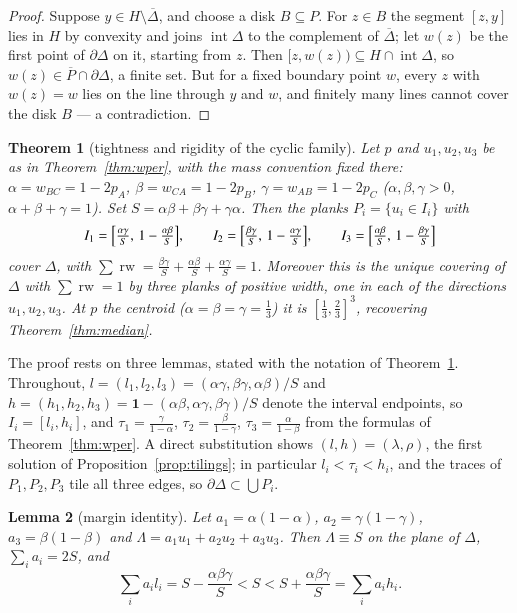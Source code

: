 \documentclass{aims}
\numberwithin{equation}{section}
\theoremstyle{plain}
\newtheorem{theorem}{Theorem}[section]
\newtheorem{lemma}[theorem]{Lemma}
\theoremstyle{definition}
\theoremstyle{remark}
\newcommand{\rw}{\operatorname{rw}}
\begin{document}
\begin{proof}
Suppose $y\in H\setminus\overline\Delta$, and choose a disk $B\subseteq P$. For
$z\in B$ the segment $[z,y]$ lies in $H$ by convexity and joins
$\operatorname{int}\Delta$ to the complement of $\overline\Delta$; let $w(z)$ be
the first point of $\partial\Delta$ on it, starting from $z$. Then
$[z,w(z))\subseteq H\cap\operatorname{int}\Delta$, so
$w(z)\in\overline P\cap\partial\Delta$, a finite set. But for a fixed boundary
point $w$, every $z$ with $w(z)=w$ lies on the line through $y$ and $w$, and
finitely many lines cannot cover the disk $B$ --- a contradiction.
\end{proof}

\begin{theorem}[tightness and rigidity of the cyclic family]\label{thm:tight}
Let $p$ and $u_1,u_2,u_3$ be as in Theorem~\ref{thm:wper}, with the mass
convention fixed there: $\alpha=w_{BC}=1-2p_A$, $\beta=w_{CA}=1-2p_B$,
$\gamma=w_{AB}=1-2p_C$ ($\alpha,\beta,\gamma>0$, $\alpha+\beta+\gamma=1$). Set
$S=\alpha\beta+\beta\gamma+\gamma\alpha$. Then the planks $P_i=\{u_i\in I_i\}$
with
\[
I_1=\Bigl[\tfrac{\alpha\gamma}S,\,1-\tfrac{\alpha\beta}S\Bigr],\qquad
I_2=\Bigl[\tfrac{\beta\gamma}S,\,1-\tfrac{\alpha\gamma}S\Bigr],\qquad
I_3=\Bigl[\tfrac{\alpha\beta}S,\,1-\tfrac{\beta\gamma}S\Bigr]
\]
cover $\Delta$, with $\sum\rw
=\tfrac{\beta\gamma}S+\tfrac{\alpha\beta}S+\tfrac{\alpha\gamma}S=1$. Moreover
this is the unique covering of $\Delta$ with $\sum\rw=1$ by three planks of
positive width, one in each of the directions $u_1,u_2,u_3$. At $p$ the centroid
($\alpha=\beta=\gamma=\tfrac13$) it is $[\tfrac13,\tfrac23]^3$, recovering
Theorem~\ref{thm:median}.
\end{theorem}

The proof rests on three lemmas, stated with the notation of
Theorem~\ref{thm:tight}. Throughout,
$l=(l_1,l_2,l_3)=(\alpha\gamma,\beta\gamma,\alpha\beta)/S$ and
$h=(h_1,h_2,h_3)=\mathbf1-(\alpha\beta,\alpha\gamma,\beta\gamma)/S$ denote the
interval endpoints, so $I_i=[l_i,h_i]$, and
$\tau_1=\frac{\gamma}{1-\alpha}$, $\tau_2=\frac{\beta}{1-\gamma}$,
$\tau_3=\frac{\alpha}{1-\beta}$ from the formulas of Theorem~\ref{thm:wper}. A
direct substitution shows $(l,h)=(\lambda,\rho)$, the first solution of
Proposition~\ref{prop:tilings}; in particular $l_i<\tau_i<h_i$, and the traces
of $P_1,P_2,P_3$ tile all three edges, so $\partial\Delta\subset\bigcup P_i$.

\begin{lemma}[margin identity]\label{lem:margin}
Let $a_1=\alpha(1-\alpha)$, $a_2=\gamma(1-\gamma)$, $a_3=\beta(1-\beta)$ and
$\Lambda=a_1u_1+a_2u_2+a_3u_3$. Then $\Lambda\equiv S$ on the plane of
$\Delta$, $\sum_ia_i=2S$, and
\begin{equation}\label{eq:margin}
\textstyle\sum_i a_il_i=S-\frac{\alpha\beta\gamma}S<S<
S+\frac{\alpha\beta\gamma}S=\sum_i a_ih_i .
\end{equation}
\end{lemma}
\end{document}
